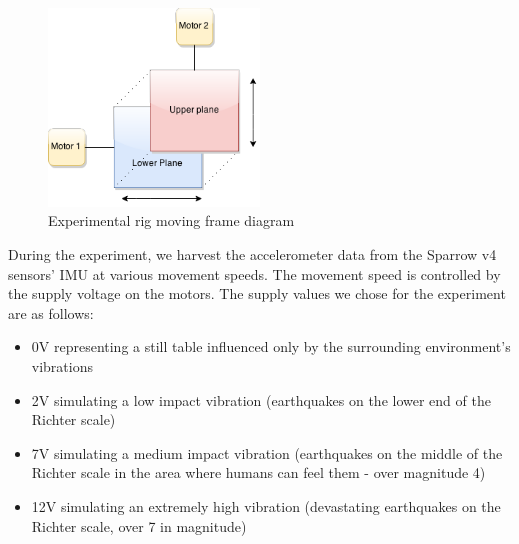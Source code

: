 \begin{figure}[ht] \centering
  \includegraphics[width=0.5\textwidth]{img/experimental-rig.png}
  \caption{Experimental rig moving frame diagram}
\end{figure}

During the experiment, we harvest the accelerometer data from the Sparrow v4 sensors' IMU at various movement speeds.
The movement speed is controlled by the supply voltage on the motors. The supply values we chose for the experiment 
are as follows:
\begin{itemize}
  \item 0V representing a still table influenced only by the surrounding environment's vibrations
  \item 2V simulating a low impact vibration (earthquakes on the lower end of the Richter scale)
  \item 7V simulating a medium impact vibration (earthquakes on the middle of the Richter scale in the area where humans can feel them - over magnitude 4)
  \item 12V simulating an extremely high vibration (devastating earthquakes on the Richter scale, over 7 in magnitude)
\end{itemize}
